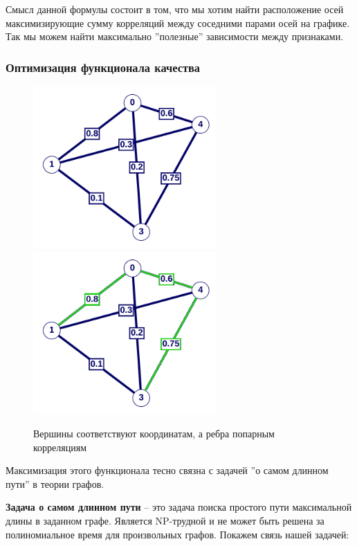 \documentclass[12pt,fleqn]{article}
\begin{document}
Смысл данной формулы состоит в том, что мы хотим найти расположение осей максимизирующие
сумму корреляций между соседними парами осей на графике. Так мы можем найти максимально ''полезные'' 
зависимости между признаками.


\subsubsection*{Оптимизация функционала качества}

\begin{figure}[htb]
    \centering
       \includegraphics[width=7cm]{graph_example_1.png} \hfill
       \includegraphics[width=7cm]{graph_example_2.png} \hfill
   \caption{Вершины соответствуют координатам, а ребра попарным корреляциям}
   \label{graph_example}
\end{figure}


Максимизация этого функционала тесно связна с задачей ''о самом длинном пути'' в теории графов.

\vspace{5pt}

\noindent \textbf{Задача о самом длинном пути} --   это задача поиска простого пути максимальной длины в заданном графе.
 Является NP-трудной и не может быть решена за 
 полиномиальное время для произвольных графов. Покажем связь нашей задачей:
\end{document}
